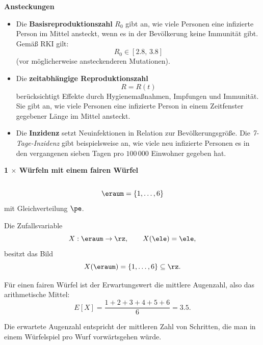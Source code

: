 \begin{bsp}
    \textbf{Ansteckungen} 
    \begin{itemize}
        \item Die \textbf{Basisreproduktionszahl} \(R_0\) gibt an, wie viele Personen
        eine infizierte Person im Mittel ansteckt, wenn es in der Bevölkerung keine
        Immunität gibt.
        Gemäß RKI gilt:
        \[
            R_0 \in [2.8,\,3.8]
        \]
        (vor möglicherweise ansteckenderen Mutationen).

        \item Die \textbf{zeitabhängige Reproduktionszahl}
        \[
            R = R(t)
        \]
        berücksichtigt Effekte durch Hygienemaßnahmen, Impfungen und Immunität.
        Sie gibt an, wie viele Personen eine infizierte Person in einem Zeitfenster
        gegebener Länge im Mittel ansteckt.

        \item Die \textbf{Inzidenz} setzt Neuinfektionen in Relation zur
        Bevölkerungsgröße.
        Die \emph{7-Tage-Inzidenz} gibt beispielsweise an,
        wie viele neu infizierte Personen es in den vergangenen sieben Tagen
        pro \(100\,000\) Einwohner gegeben hat.
    \end{itemize}
\end{bsp}

\begin{bsp}
    \textbf{1 $\times$ Würfeln mit einem fairen Würfel}  \\
     \\
    \[
        \eraum = \{1,\dots,6\}
    \]
    mit Gleichverteilung \(\pe\).

    Die Zufallsvariable
    \[
        X : \eraum \to \rz,
        \qquad
        X(\ele)=\ele,
    \]
    besitzt das Bild
    \[
        X(\eraum)=\{1,\dots,6\}\subseteq\rz.
    \]

    Für einen fairen Würfel ist der Erwartungswert die mittlere Augenzahl, also das
    arithmetische Mittel:
    \[
        E[X]
        =
        \frac{1+2+3+4+5+6}{6}
        =
        3.5.
    \]

    Die erwartete Augenzahl entspricht der mittleren Zahl von Schritten, die man
    in einem Würfelspiel pro Wurf vorwärtsgehen würde.
\end{bsp}

